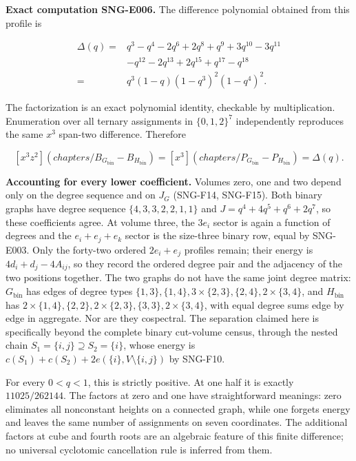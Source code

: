 \documentclass[
  11pt,
  a4paper,
]{report}
\begin{document}
\textbf{Exact computation SNG-E006.} The difference polynomial obtained
from this profile is

\[
\begin{aligned}
\Delta(q)={}&q^3-q^4-2q^6+2q^8+q^9+3q^{10}-3q^{11}\\
&-q^{12}-2q^{13}+2q^{15}+q^{17}-q^{18}\\
={}&\boxed{q^3(1-q)(1-q^3)^2(1-q^4)^2}.
\end{aligned}
\]

The factorization is an exact polynomial identity, checkable by
multiplication. Enumeration over all ternary assignments in
\(\{0,1,2\}^7\) independently reproduces the same \(x^3\) span-two
difference. Therefore

\[
[x^3z^2](chapters/B_{G_{\mathrm{bin}}}-B_{H_{\mathrm{bin}}})
=[x^3](chapters/P_{G_{\mathrm{bin}}}-P_{H_{\mathrm{bin}}})=\Delta(q).
\]

\textbf{Accounting for every lower coefficient.} Volumes zero, one and
two depend only on the degree sequence and on \(J_G\) (SNG-F14,
SNG-F15). Both binary graphs have degree sequence \(\{4,3,3,2,2,1,1\}\)
and \(J=q^4+4q^5+q^6+2q^7\), so these coefficients agree. At volume
three, the \(3e_i\) sector is again a function of degrees and the
\(e_i+e_j+e_k\) sector is the size-three binary row, equal by SNG-E003.
Only the forty-two ordered \(2e_i+e_j\) profiles remain; their energy is
\(4d_i+d_j-4A_{ij}\), so they record the ordered degree pair and the
adjacency of the two positions together. The two graphs do not have the
same joint degree matrix: \(G_{\mathrm{bin}}\) has edges of degree types
\(\{1,3\},\{1,4\},3\times\{2,3\},\{2,4\},2\times\{3,4\}\), and
\(H_{\mathrm{bin}}\) has
\(2\times\{1,4\},\{2,2\},2\times\{2,3\},\{3,3\},2\times\{3,4\}\), with
equal degree sums edge by edge in aggregate. Nor are they cospectral.
The separation claimed here is specifically beyond the complete binary
cut-volume census, through the nested chain
\(S_1=\{i,j\}\supseteq S_2=\{i\}\), whose energy is
\(c(S_1)+c(S_2)+2e(\{i\},V\setminus\{i,j\})\) by SNG-F10.

For every \(0<q<1\), this is strictly positive. At one half it is
exactly \(11025/262144\). The factors at zero and one have
straightforward meanings: zero eliminates all nonconstant heights on a
connected graph, while one forgets energy and leaves the same number of
assignments on seven coordinates. The additional factors at cube and
fourth roots are an algebraic feature of this finite difference; no
universal cyclotomic cancellation rule is inferred from them.
\end{document}
